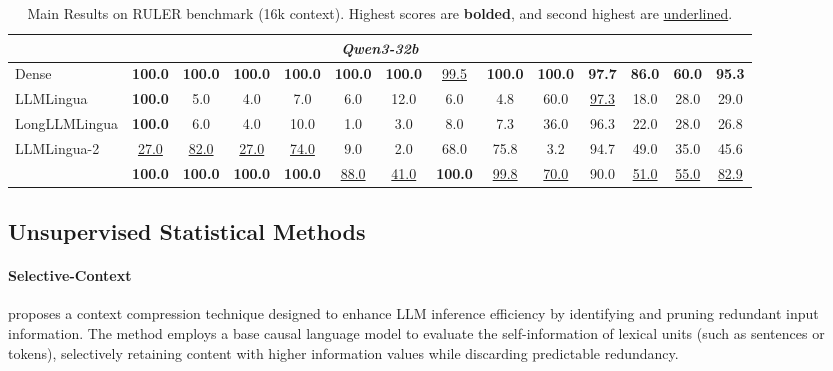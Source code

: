\documentclass[11pt]{article}
\newcommand{\ours}{\text{BEAVER}\xspace}
\begin{document}
\begin{table}[t]
{\begin{tabular}{l | ccc | cccccc | c | cc | c}
            \multicolumn{14}{c}{\textbf{\textit{Qwen3-32b}}} \\
            \midrule
            Dense     & \textbf{100.0} & \textbf{100.0} & \textbf{100.0} & \textbf{100.0} & \textbf{100.0} & \textbf{100.0} & \underline{99.5} & \textbf{100.0} & \textbf{100.0} & \textbf{97.7} & \textbf{86.0} & \textbf{60.0} & \textbf{95.3} \\
            LLMLingua  & \textbf{100.0} & 5.0 & 4.0 & 7.0 & 6.0 & 12.0 & 6.0 & 4.8 & 60.0 & \underline{97.3} & 18.0 & 28.0 & 29.0 \\
            LongLLMLingua  & \textbf{100.0} & 6.0 & 4.0 & 10.0 & 1.0 & 3.0 & 8.0 & 7.3 & 36.0 & 96.3 & 22.0 & 28.0 & 26.8 \\
            LLMLingua-2  & \underline{27.0} & \underline{82.0} & \underline{27.0} & \underline{74.0} & 9.0 & 2.0 & 68.0 & 75.8 & 3.2 & 94.7 & 49.0 & 35.0 & 45.6 \\
            \rowcolor{blue!5} 
            \textbf{\ours} & \textbf{100.0} & \textbf{100.0} & \textbf{100.0} & \textbf{100.0} & \underline{88.0} & \underline{41.0} & \textbf{100.0} & \underline{99.8} & \underline{70.0} & 90.0 & \underline{51.0} & \underline{55.0} & \underline{82.9} \\
            
            \bottomrule
        \end{tabular}
    }
    \caption{Main Results on RULER benchmark (16k context).
    Highest scores are \textbf{bolded}, and second highest are \underline{underlined}.
    }
    \label{tab:ruler}
\end{table}

\subsection{Unsupervised Statistical Methods}

\paragraph{Selective-Context}\cite{li2023selective} proposes a context compression technique designed to enhance LLM inference efficiency by identifying and pruning redundant input information. The method employs a base causal language model to evaluate the self-information of lexical units (such as sentences or tokens), selectively retaining content with higher information values while discarding predictable redundancy.
\end{document}
